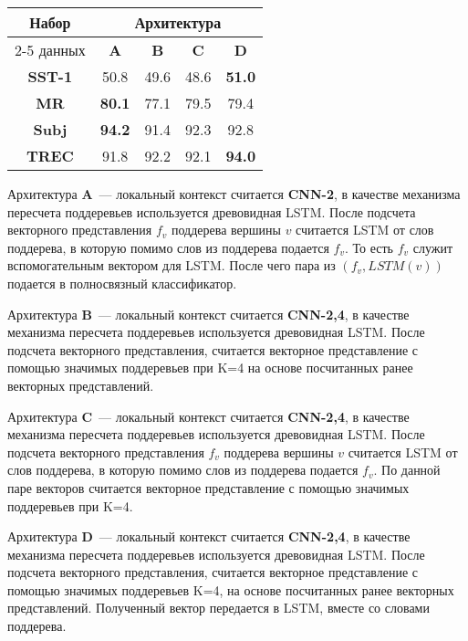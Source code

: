 \vspace{5mm}
\begin{minipage}{\linewidth}
 \label{tab:title} 
\begin{tabular}{|c|c|c|c|c|}
\hline
\multirow{2}{*}{Набор}   &             \multicolumn{4}{c|}{Архитектура} \\ \cline{2-5} 
     данных              & \textbf{A}  & \textbf{B} & \textbf{C} & \textbf{D} \\ \hline
\textbf{SST-1}           & 50.8        & 49.6   & 48.6   & \textbf{51.0}     \\ \hline
\textbf{MR}              & \textbf{80.1}        & 77.1     & 79.5     & 79.4     \\ \hline
\textbf{Subj}            & \textbf{94.2}        & 91.4     & 92.3     & 92.8     \\ \hline
\textbf{TREC}            & 91.8       & 92.2    & 92.1    & \textbf{94.0}    \\ \hline
\end{tabular}
\end{minipage}
\vspace{5mm}

Архитектура \textbf{A}~--- локальный контекст считается \textbf{CNN-2}, в качестве механизма пересчета поддеревьев используется древовидная LSTM. После подсчета векторного представления $f_v$ поддерева вершины $v$ считается LSTM от слов поддерева, в которую помимо слов из поддерева подается $f_v$. То есть $f_v$ служит вспомогательным вектором для
LSTM. После чего пара из $(f_v, LSTM(v))$ подается в полносвязный классификатор.

Архитектура \textbf{B}~--- локальный контекст считается \textbf{CNN-2,4}, в качестве механизма пересчета поддеревьев используется древовидная LSTM. После подсчета векторного представления, считается векторное представление с помощью значимых поддеревьев при K=4 на основе посчитанных ранее векторных представлений.

Архитектура \textbf{C}~--- локальный контекст считается \textbf{CNN-2,4}, в качестве механизма пересчета поддеревьев используется древовидная LSTM. После подсчета векторного представления $f_v$ поддерева вершины $v$ считается LSTM от слов поддерева, в которую помимо слов из поддерева подается $f_v$. По данной паре векторов считается векторное представление с помощью значимых поддеревьев при K=4.

Архитектура \textbf{D}~--- локальный контекст считается \textbf{CNN-2,4}, в качестве механизма пересчета поддеревьев используется древовидная LSTM. После подсчета векторного представления, считается векторное представление с помощью значимых поддеревьев K=4, на основе посчитанных ранее векторных представлений. Полученный вектор передается в LSTM, вместе со словами поддерева.

